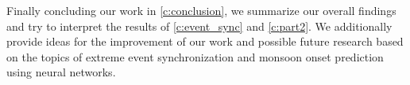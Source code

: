 Finally concluding our work in \cref{c:conclusion}, we summarize our overall findings and try to interpret the results of \cref{c:event_sync} and \cref{c:part2}. We additionally provide ideas for the improvement of our work and possible future research based on the topics of extreme event synchronization and monsoon onset prediction using neural networks.
